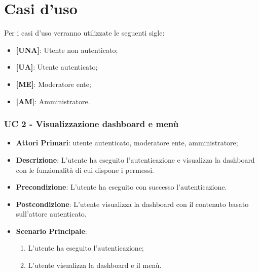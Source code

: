 \section{Casi d'uso}
	Per i casi d'uso verranno utilizzate le seguenti sigle:
	\begin{itemize}
		\item \textbf{[UNA]}: Utente non autenticato;
		\item \textbf{[UA]}: Utente autenticato;
		\item \textbf{[ME]}: Moderatore ente;
		\item \textbf{[AM]}: Amministratore.
	\end{itemize}

		

		
		

		\subsubsection{UC 2 - Visualizzazione dashboard e menù}
		
		\begin{itemize}
			\item \textbf{Attori Primari}: utente autenticato, moderatore ente, amministratore;
			\item \textbf{Descrizione}: L'utente ha eseguito l'autenticazione e visualizza la dashboard con le funzionalità di cui dispone i permessi.
			\item \textbf{Precondizione}: L'utente ha eseguito  con successo l'autenticazione.
			\item \textbf{Postcondizione}: L'utente visualizza la dashboard con il contenuto basato sull'attore autenticato.
			\item \textbf{Scenario Principale}:
			\begin{enumerate}
				\item L'utente ha eseguito l'autenticazione;
				\item L'utente visualizza la dashboard e il menù.
			\end{enumerate}	
		\end{itemize}


